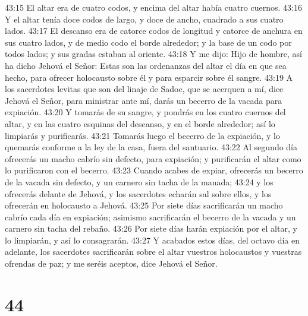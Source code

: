 43:15 El altar era de cuatro codos,  y encima del altar había cuatro cuernos.  
43:16 Y el altar tenía doce codos   de largo, y doce de ancho, cuadrado a sus cuatro lados.  
43:17 El descanso era de catorce codos  de longitud y catorce de anchura en sus cuatro lados, y de medio codo el borde alrededor; y la base de un codo por todos lados; y sus gradas estaban al oriente. 
43:18 Y me dijo: Hijo de hombre, así ha dicho Jehová el Señor: Estas son las ordenanzas del altar el día en que sea hecho, para ofrecer holocausto sobre él y para esparcir sobre él sangre.  
43:19 A los sacerdotes levitas que son del linaje de Sadoc, que se acerquen a mí, dice Jehová el Señor, para ministrar ante mí, darás un becerro de la vacada para expiación.  
43:20 Y tomarás de su sangre, y pondrás en los cuatro cuernos del altar, y en las cuatro esquinas del descanso, y en el borde alrededor; así lo limpiarás y purificarás. 
43:21 Tomarás luego el becerro de la expiación, y lo quemarás conforme a la ley de la casa, fuera del santuario.  
43:22 Al segundo día ofrecerás un macho cabrío sin defecto, para expiación; y purificarán el altar como lo purificaron con el becerro.  
43:23 Cuando acabes de expiar, ofrecerás un becerro de la vacada sin defecto, y un carnero sin tacha de la manada;  
43:24 y los ofrecerás delante de Jehová, y los sacerdotes echarán sal sobre ellos, y los ofrecerán en holocausto a Jehová.  
43:25 Por siete días sacrificarán un macho cabrío cada día en expiación; asimismo sacrificarán el becerro de la vacada y un carnero sin tacha del rebaño.  
43:26 Por siete días harán expiación por el altar, y lo limpiarán, y así lo consagrarán.  
43:27 Y acabados estos días, del octavo día en adelante, los sacerdotes sacrificarán sobre el altar vuestros holocaustos y vuestras ofrendas de paz; y me seréis aceptos, dice Jehová el Señor. 

\chapter{44}

